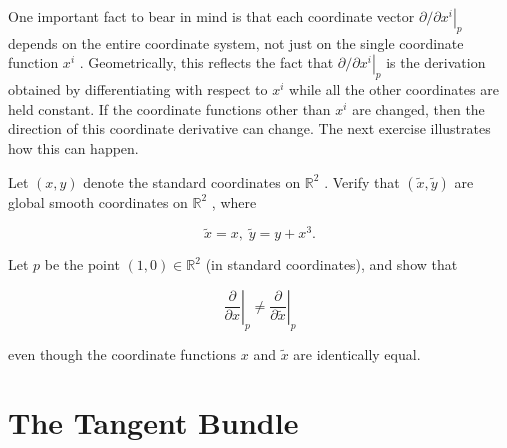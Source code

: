\begin{remark}
\label{rem:3-15-extra-5}
\mathlibok
One important fact to bear in mind is that each coordinate vector $\partial /{\left. \partial {x}^{i}\right| }_{p}$ depends on the entire coordinate system, not just on the single coordinate function ${x}^{i}$ . Geometrically, this reflects the fact that $\partial /{\left. \partial {x}^{i}\right| }_{p}$ is the derivation obtained by differentiating with respect to ${x}^{i}$ while all the other coordinates are held constant. If the coordinate functions other than ${x}^{i}$ are changed, then the direction of this coordinate derivative can change. The next exercise illustrates how this can happen.
\end{remark}

\begin{exercise}
\label{exer:3-17}
\leanok
{}
Let $\left( {x, y}\right)$ denote the standard coordinates on ${\mathbb{R}}^{2}$ . Verify that $\left( {\widetilde{x},\widetilde{y}}\right)$ are global smooth coordinates on ${\mathbb{R}}^{2}$ , where

\[
\widetilde{x} = x,\;\widetilde{y} = y + {x}^{3}.
\]

Let $p$ be the point $\left( {1,0}\right)  \in  {\mathbb{R}}^{2}$ (in standard coordinates), and show that

\[
{\left. \frac{\partial }{\partial x}\right| }_{p} \neq  {\left. \frac{\partial }{\partial \widetilde{x}}\right| }_{p}
\]

even though the coordinate functions $x$ and $\widetilde{x}$ are identically equal.
\end{exercise}


\section{The Tangent Bundle}

